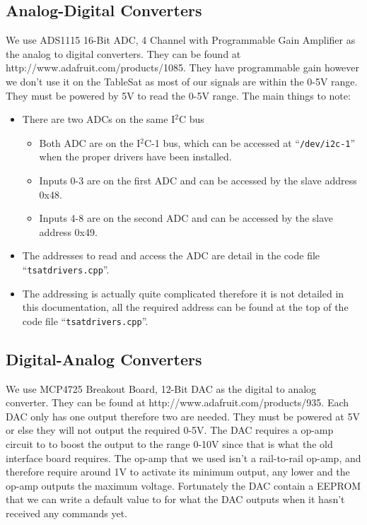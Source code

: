 \documentclass{article}
\begin{document}
\subsection{Analog-Digital Converters}
We use ADS1115 16-Bit ADC, 4 Channel with Programmable Gain Amplifier as the analog to digital converters. They can be found at http://www.adafruit.com/products/1085. They have programmable gain however we don't use it on the TableSat as most of our signals are within the 0-5V range. They must be powered by 5V to read the 0-5V range. The main things to note:

\begin{itemize}
    \item There are two ADCs on the same I$^2$C bus
    \begin{itemize}
        \item Both ADC are on the I$^2$C-1 bus, which can be accessed at ``{\tt /dev/i2c-1}'' when the proper drivers have been installed.
        \item Inputs 0-3 are on the first ADC and can be accessed by the slave address 0x48.
        \item Inputs 4-8 are on the second ADC and can be accessed by the slave address 0x49.
    \end{itemize}
    \item The addresses to read and access the ADC are detail in the code file ``{\tt tsat\textunderscore drivers.cpp}''.
    \item The addressing is actually quite complicated therefore it is not detailed in this documentation, all the required address can be found at the top of the code file ``{\tt tsat\textunderscore drivers.cpp}''.
\end{itemize}

\subsection{Digital-Analog Converters}
We use MCP4725 Breakout Board, 12-Bit DAC as the digital to analog converter. They can be found at http://www.adafruit.com/products/935. Each DAC only has one output therefore two are needed. They must be powered at 5V or else they will not output the required 0-5V. The DAC requires a op-amp circuit to to boost the output to the range 0-10V since that is what the old interface board requires. The op-amp that we used isn't a rail-to-rail op-amp, and therefore require around 1V to activate its minimum output, any lower and the op-amp outputs the maximum voltage. Fortunately the DAC contain a EEPROM that we can write a default value to for what the DAC outputs when it hasn't received any commands yet.
\end{document}
